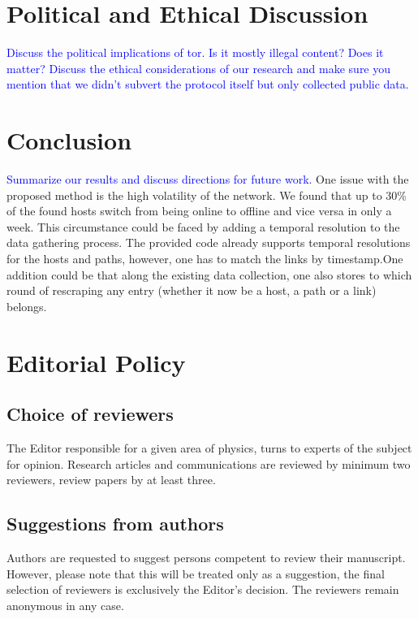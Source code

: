 \documentclass[USenglish,oneside,twocolumn]{article}
\newcommand\CONTENT[1]{\textcolor{blue}{#1}}
\begin{document}
\section{Political and Ethical Discussion}

\CONTENT{Discuss the political implications of tor. Is it mostly illegal content? Does it matter? Discuss the ethical considerations of our research and make sure you mention that we didn’t subvert the protocol itself but only collected public data.}

\section{Conclusion}

\CONTENT{Summarize our results and discuss directions for future work.}
One issue with the proposed method is the high volatility of the network. We found that up to 30\% of the found hosts switch from being online to offline and vice versa in only a week. This circumstance could be faced by adding a temporal resolution to the data gathering process.
The provided code already supports temporal resolutions for the hosts and paths, however, one has to match the links by timestamp.One addition could be that along the existing data collection, one also stores to which round of rescraping any entry (whether it now be a host, a path or a link) belongs.

\section{Editorial Policy}

\subsection{Choice of reviewers}

The Editor responsible for a given area of physics, turns to experts of the subject for opinion. Research articles and communications are reviewed by minimum two reviewers, review papers by at least three.

\subsection{Suggestions from authors}

Authors are requested to suggest persons competent to review their manuscript. However, please note that this will be treated only as a suggestion, the final selection of reviewers is exclusively the Editor's decision. The reviewers remain anonymous in any case.
\end{document}
